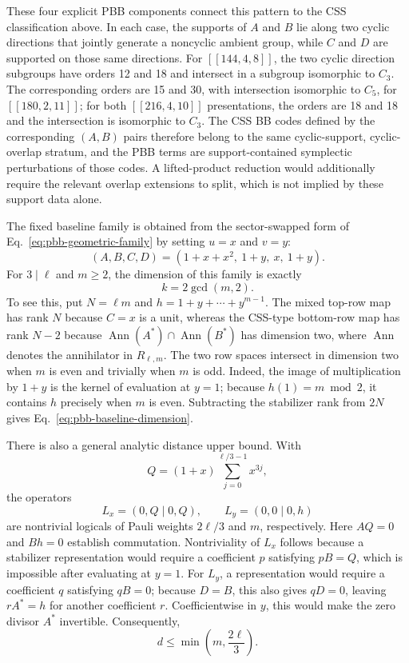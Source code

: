 \documentclass[aps,prx,twocolumn,superscriptaddress,nofootinbib,floatfix]{revtex4-2}
\newcommand{\code}[1]{\ensuremath{\left[\!\left[#1\right]\!\right]}}
\begin{document}
These four explicit PBB components connect this pattern to the CSS
classification above.  In each case, the supports of $A$ and $B$ lie along two
cyclic directions that jointly generate a noncyclic ambient group, while
$C$ and $D$ are supported on those same directions.  For $\code{144,4,8}$,
the two cyclic direction subgroups have orders 12 and 18 and intersect in a
subgroup isomorphic to $C_3$.  The corresponding orders are 15 and 30, with
intersection isomorphic to $C_5$, for $\code{180,2,11}$; for both
$\code{216,4,10}$ presentations, the orders are 18 and 18 and the intersection
is isomorphic to $C_3$.  The CSS
BB codes defined by the corresponding
$(A,B)$ pairs therefore belong to the same cyclic-support, cyclic-overlap
stratum, and the PBB terms are support-contained symplectic perturbations of
those codes.  A
lifted-product reduction would additionally require the relevant overlap
extensions to split, which is not implied by these support data alone.

The fixed baseline family is obtained from the sector-swapped form of
Eq.~\eqref{eq:pbb-geometric-family} by setting $u=x$ and $v=y$:
\begin{equation}
 (A,B,C,D)=(1+x+x^2,\ 1+y,\ x,\ 1+y).
 \label{eq:pbb-baseline-family}
\end{equation}
For $3\mid\ell$ and $m\geq2$, the dimension of this family is exactly
\begin{equation}
 k=2\gcd(m,2).
 \label{eq:pbb-baseline-dimension}
\end{equation}
To see this, put $N=\ell m$ and
$h=1+y+\cdots+y^{m-1}$.  The mixed top-row map has rank $N$ because
$C=x$ is a unit, whereas the CSS-type bottom-row map has rank $N-2$ because
$\operatorname{Ann}(A^*)\cap\operatorname{Ann}(B^*)$ has dimension two, where
$\operatorname{Ann}$ denotes the annihilator in $R_{\ell,m}$.
The two row spaces intersect in dimension two when $m$ is even and trivially
when $m$ is odd.  Indeed, the image of multiplication by $1+y$ is the kernel
of evaluation at $y=1$;
because $h(1)=m\bmod 2$, it contains $h$ precisely when $m$ is even.
Subtracting the stabilizer rank from $2N$ gives
Eq.~\eqref{eq:pbb-baseline-dimension}.

There is also a general analytic distance upper bound.  With
\[
 Q=(1+x)\sum_{j=0}^{\ell/3-1}x^{3j},
\]
the operators
\[
 L_x=(0,Q\mid0,Q),\qquad L_y=(0,0\mid0,h)
\]
are nontrivial logicals of Pauli weights $2\ell/3$ and $m$, respectively.
Here $AQ=0$ and $Bh=0$ establish commutation.  Nontriviality of $L_x$
follows because a stabilizer representation would require a coefficient
$p$ satisfying $pB=Q$, which is impossible after evaluating at $y=1$.
For $L_y$, a representation would require a coefficient $q$ satisfying
$qB=0$; because $D=B$, this also gives $qD=0$, leaving $rA^*=h$ for another
coefficient $r$.  Coefficientwise in $y$, this would make the zero divisor
$A^*$ invertible.  Consequently,
\begin{equation}
 d\leq\min\!\left(m,\frac{2\ell}{3}\right).
 \label{eq:pbb-baseline-bound}
\end{equation}
\end{document}
